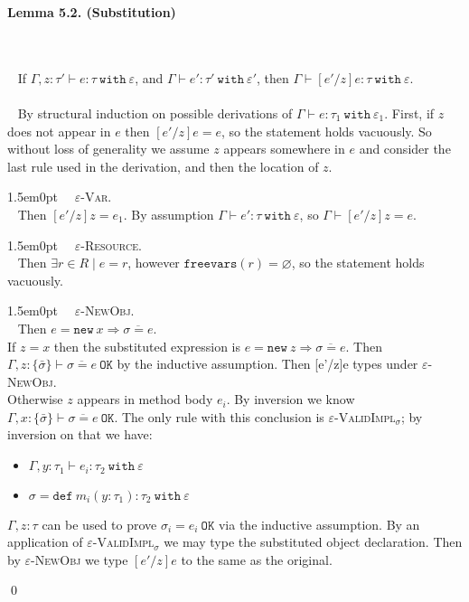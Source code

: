 \documentclass{llncs}
\newcommand{\keywadj}[1]{\mathtt{#1}}
\newcommand{\keyw}[1]{\keywadj{#1}~}
\newcommand{\thm}[3]{
	\begin{large}
		\bf{#1}
	\end{large} \\\\
	\fbox{Statement.} ~ #2
	\fbox{Proof.}~ #3 \qed
}
\newcommand{\proofcase}[2]{
	\begin{adjustwidth}{1.5em}{0pt}
		\fbox{Case.}~~#1. \\ ~#2
	\end{adjustwidth}
}
\begin{document}
\thm{Lemma 5.2. (Substitution)}
{If $\Gamma, z : \tau' \vdash e : \tau~\keyw{with} \varepsilon$, and $\Gamma \vdash e' : \tau'~\keyw{with} \varepsilon'$, then $\Gamma \vdash [e'/z]e : \tau~\keyw{with} \varepsilon$. \\\\}
{By structural induction on possible derivations of $\Gamma \vdash e : \tau_1~\keyw{with} \varepsilon_1$. First, if $z$ does not appear in $e$ then $[e'/z]e = e$, so the statement holds vacuously. So without loss of generality we assume $z$ appears somewhere in $e$ and consider the last rule used in the derivation, and then the location of $z$. \\

	\proofcase{\textsc{$\varepsilon$-Var}} {
		Then $[e'/z]z = e_1$. By assumption $\Gamma \vdash e' : \tau~\keyw{with} \varepsilon$, so $\Gamma \vdash [e'/z]z = e$. \\
	}
		
	\proofcase{\textsc{$\varepsilon$-Resource}} {
		Then $\exists r \in R \mid e = r$, however $\keywadj{freevars}(r) = \varnothing$, so the statement holds vacuously.\\
	}
		
	\proofcase{\textsc{$\varepsilon$-NewObj}} {
		Then $e = \keyw{new} x \Rightarrow \overline{\sigma =e}$. \\
		
		\noindent
		If $z = x$ then the substituted expression is $e = \keyw{new} z \Rightarrow \overline{\sigma = e}$. Then $\Gamma, z : \{ \bar \sigma \} \vdash \overline{\sigma = e}~\keywadj{OK}$ by the inductive assumption. Then [e'/z]e types under \textsc{$\varepsilon$-NewObj}. \\
		
		\noindent
		 Otherwise $z$ appears in method body $e_i$. By inversion we know $\Gamma, x : \{ \bar \sigma \} \vdash \overline {\sigma = e}~\keywadj{OK}$. The only rule with this conclusion is \textsc{$\varepsilon$-ValidImpl$_\sigma$}; by inversion on that we have:
		 \begin{itemize}
		 	\item $\Gamma, y : \tau_1 \vdash e_i : \tau_2~\keyw{with} \varepsilon$
		 	\item $\sigma = \keyw{def} m_i(y : \tau_1) : \tau_2~\keyw{with} \varepsilon$
		\end{itemize}
	$\Gamma, z : \tau$ can be used to prove $\sigma_i = e_i~\keywadj{OK}$ via the inductive assumption. By an application of \textsc{$\varepsilon$-ValidImpl$_\sigma$} we may type the substituted object declaration. Then by \textsc{$\varepsilon$-NewObj} we type $[e'/z]e$ to the same as the original.\\
	}
	
}
\end{document}

